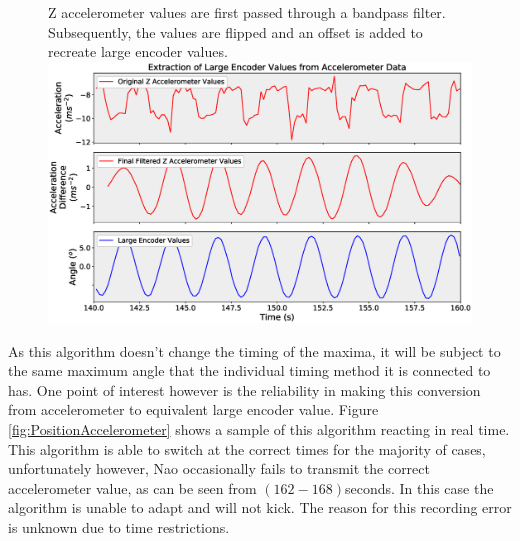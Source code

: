 \documentclass[11pt]{article}
\begin{document}
    \begin{figure}[!htb]
        \centering
        \captionbox
             {Z accelerometer values are first passed through a bandpass filter. Subsequently, the values are flipped and an offset is added to recreate large encoder values.\label{fig:AccelerometerFiltering}}
             {\includegraphics[width=1.0\textwidth]{AccelerometerFiltering.eps}}
    \end{figure}
    
As this algorithm doesn't change the timing of the maxima, it will be subject to the same maximum angle that the individual timing method it is connected to has. One point of interest however is the reliability in making this conversion from accelerometer to equivalent large encoder value. Figure \ref{fig:PositionAccelerometer} shows a sample of this algorithm reacting in real time. This algorithm is able to switch at the correct times for the majority of cases, unfortunately however, Nao occasionally fails to transmit the correct accelerometer value, as can be seen from $(162-168)$seconds. In this case the algorithm is unable to adapt and will not kick. The reason for this recording error is unknown due to time restrictions.\\
\end{document}
